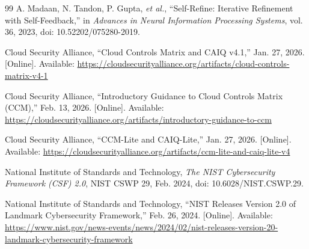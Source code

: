 \documentclass[11pt,journal,onecolumn]{IEEEtran}
\begin{document}
\begin{thebibliography}{99}
A. Madaan, N. Tandon, P. Gupta, \textit{et al.}, ``Self-Refine: Iterative Refinement with Self-Feedback,'' in \textit{Advances in Neural Information Processing Systems}, vol. 36, 2023, doi: 10.52202/075280-2019.

Cloud Security Alliance, ``Cloud Controls Matrix and CAIQ v4.1,'' Jan. 27, 2026. [Online]. Available: \url{https://cloudsecurityalliance.org/artifacts/cloud-controls-matrix-v4-1}

Cloud Security Alliance, ``Introductory Guidance to Cloud Controls Matrix (CCM),'' Feb. 13, 2026. [Online]. Available: \url{https://cloudsecurityalliance.org/artifacts/introductory-guidance-to-ccm}

Cloud Security Alliance, ``CCM-Lite and CAIQ-Lite,'' Jan. 27, 2026. [Online]. Available: \url{https://cloudsecurityalliance.org/artifacts/ccm-lite-and-caiq-lite-v4}

National Institute of Standards and Technology, \textit{The NIST Cybersecurity Framework (CSF) 2.0}, NIST CSWP 29, Feb. 2024, doi: 10.6028/NIST.CSWP.29.

National Institute of Standards and Technology, ``NIST Releases Version 2.0 of Landmark Cybersecurity Framework,'' Feb. 26, 2024. [Online]. Available: \url{https://www.nist.gov/news-events/news/2024/02/nist-releases-version-20-landmark-cybersecurity-framework}

\end{thebibliography}
\end{document}

